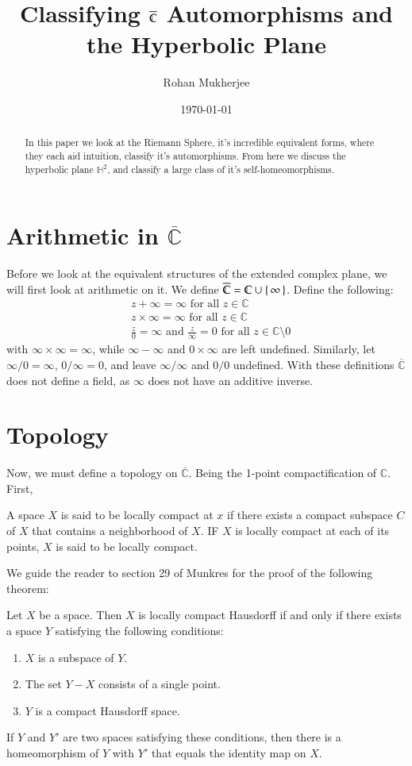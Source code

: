 \documentclass[12pt]{article}
\title{Classifying $\overline{\C}$ Automorphisms and the Hyperbolic Plane}
\date{\today}
\author{Rohan Mukherjee}
\newenvironment{theorem}{\begin{mytheorem}}{\end{mytheorem}}
\theoremstyle{definitionstyle}
\newenvironment{definition}{\begin{mydef}}{\end{mydef}}
\def\mbb#1{\mathbb{#1}}
\def \C{\mbb{C}}
\renewcommand{\H}{\mbb H}
\begin{document}
\maketitle

	\begin{abstract}
		In this paper we look at the Riemann Sphere, it's incredible equivalent forms, where they each aid intuition, classify it's automorphisms. From here we discuss the hyperbolic plane $\H^2$, and classify a large class of it's self-homeomorphisms. 
	\end{abstract}
	
	\section{Arithmetic in $\overline{\C}$}
	Before we look at the equivalent structures of the extended complex plane, we will first look at arithmetic on it. We define $\overline{\C} = \C \cup \set{\infty}$. Define the following:
	\begin{align*}
		&z + \infty = \infty \text{ for all $z \in \C$}\\
		&z \times \infty = \infty \text{ for all $z \in \C$}\\
		&\frac{z}0 = \infty \text{ and } \frac{z}{\infty} = 0 \text{ for all $z \in \C \setminus 0$}
	\end{align*}
	with $\infty \times \infty = \infty$, while $\infty - \infty$ and $0 \times \infty$ are left undefined. Similarly, let $\infty/0 = \infty$, $0/\infty = 0$, and leave $\infty/\infty$ and $0/0$ undefined. With these definitions $\overline{\C}$ does not define a field, as $\infty$ does not have an additive inverse. 
	
	\section{Topology}
	Now, we must define a topology on $\overline{\C}$. Being the 1-point compactification of $\C$. First,
	\begin{definition}
		A space $X$ is said to be locally compact at $x$ if there exists a compact subspace $C$ of $X$ that contains a neighborhood of $X$. IF $X$ is locally compact at each of its points, $X$ is said to be locally compact.
	\end{definition}
	We guide the reader to section 29 of Munkres for the proof of the following theorem:
	\begin{theorem}
		Let $X$ be a space. Then $X$ is locally compact Hausdorff if and only if there exists a space $Y$ satisfying the following conditions:
		\begin{enumerate}
			\item $X$ is a subspace of $Y$.
			\item The set $Y - X$ consists of a single point.
			\item $Y$ is a compact Hausdorff space.
		\end{enumerate}
		If $Y$ and $Y'$ are two spaces satisfying these conditions, then there is a homeomorphism of $Y$ with $Y'$ that equals the identity map on $X$.
	\end{theorem}
	
\end{document}

